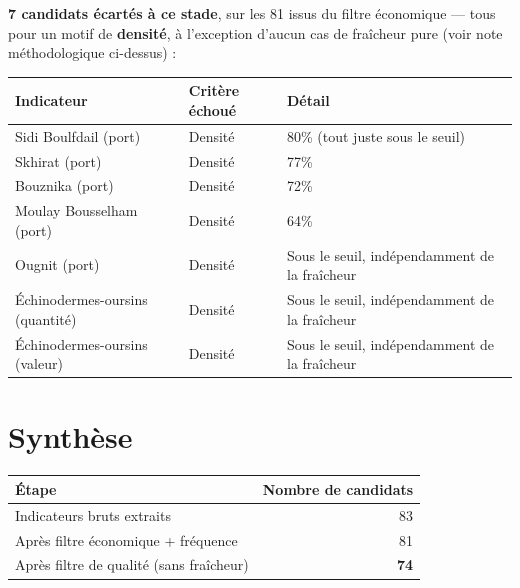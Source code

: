 \documentclass[11pt,a4paper]{article}
\begin{document}
\begin{fichebox}
\textbf{7 candidats écartés à ce stade}, sur les 81 issus du filtre économique --- tous pour un motif de \textbf{densité}, à l'exception d'aucun cas de fraîcheur pure (voir note méthodologique ci-dessus) :

\begin{center}
\small
\begin{tabular}{p{5cm}p{3.5cm}p{5cm}}
\toprule
\textbf{Indicateur} & \textbf{Critère échoué} & \textbf{Détail} \\
\midrule
Sidi Boulfdail (port) & Densité & 80\% (tout juste sous le seuil) \\
Skhirat (port) & Densité & 77\% \\
Bouznika (port) & Densité & 72\% \\
Moulay Bousselham (port) & Densité & 64\% \\
Ougnit (port) & Densité & Sous le seuil, indépendamment de la fraîcheur \\
Échinodermes-oursins (quantité) & Densité & Sous le seuil, indépendamment de la fraîcheur \\
Échinodermes-oursins (valeur) & Densité & Sous le seuil, indépendamment de la fraîcheur \\
\bottomrule
\end{tabular}
\end{center}
\end{fichebox}

\section{Synthèse}

\begin{fichebox}
\begin{center}
\begin{tabular}{lr}
\toprule
\textbf{Étape} & \textbf{Nombre de candidats} \\
\midrule
Indicateurs bruts extraits & 83 \\
Après filtre économique + fréquence & 81 \\
Après filtre de qualité (sans fraîcheur) & \textbf{74} \\
\bottomrule
\end{tabular}
\end{center}
\end{fichebox}
\end{document}
